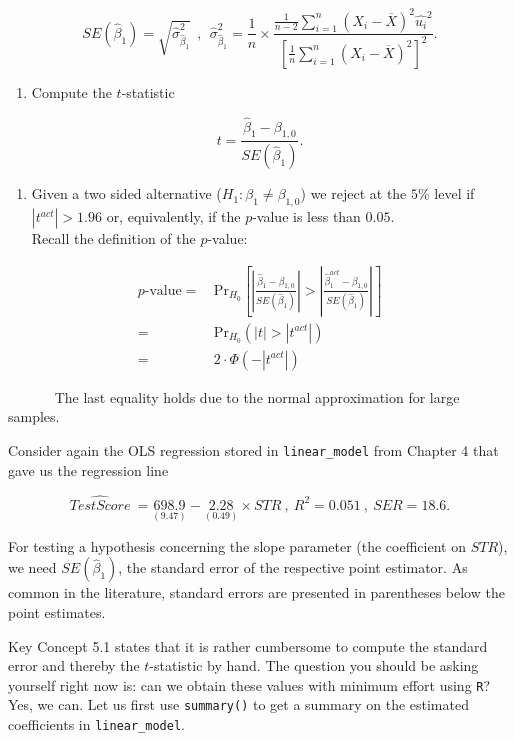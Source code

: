 \documentclass[]{book}
\providecommand{\tightlist}{%
  \setlength{\itemsep}{0pt}\setlength{\parskip}{0pt}}
\theoremstyle{definition}
\theoremstyle{definition}
\theoremstyle{definition}
\theoremstyle{remark}
\begin{document}
\[ SE(\hat{\beta}_1) = \sqrt{ \hat{\sigma}^2_{\hat{\beta}_1} } \ \ , \ \ 
  \hat{\sigma}^2_{\hat{\beta}_1} = \frac{1}{n} \times \frac{\frac{1}{n-2} \sum_{i=1}^n (X_i - \overline{X})^2 \hat{u_i}^2 }{ \left[ \frac{1}{n} \sum_{i=1}^n (X_i - \overline{X})^2 \right]^2}.
\]

\begin{enumerate}
\def\labelenumi{\arabic{enumi}.}
\setcounter{enumi}{1}
\tightlist
\item
  Compute the \(t\)-statistic
\end{enumerate}

\[ t = \frac{\hat{\beta}_1 - \beta_{1,0}}{ SE(\hat{\beta}_1) }. \]

\begin{enumerate}
\def\labelenumi{\arabic{enumi}.}
\setcounter{enumi}{2}
\tightlist
\item
  Given a two sided alternative (\(H_1:\beta_1 \neq \beta_{1,0}\)) we
  reject at the \(5\%\) level if \(|t^{act}| > 1.96\) or, equivalently,
  if the \(p\)-value is less than \(0.05\).\\
  Recall the definition of the \(p\)-value:
\end{enumerate}

\begin{align}
    p \text{-value} =& \, \text{Pr}_{H_0} \left[ \left| \frac{ \hat{\beta}_1 - \beta_{1,0} }{ SE(\hat{\beta}_1) } \right| > \left|        \frac{ \hat{\beta}_1^{act} - \beta_{1,0} }{ SE(\hat{\beta}_1) } \right| \right] \\
    =& \, \text{Pr}_{H_0} (|t| > |t^{act}|) \\
    =& \, 2 \cdot \Phi(-|t^{act}|)
  \end{align}

~~~~~~ The last equality holds due to the normal approximation for large
samples.

Consider again the OLS regression stored in \texttt{linear\_model} from
Chapter 4 that gave us the regression line

\[ \widehat{TestScore} \ = \underset{(9.47)}{698.9} - \underset{(0.49)}{2.28} \times STR \ , \ R^2=0.051 \ , \ SER=18.6. \]

For testing a hypothesis concerning the slope parameter (the coefficient
on \(STR\)), we need \(SE(\hat{\beta}_1)\), the standard error of the
respective point estimator. As common in the literature, standard errors
are presented in parentheses below the point estimates.

Key Concept 5.1 states that it is rather cumbersome to compute the
standard error and thereby the \(t\)-statistic by hand. The question you
should be asking yourself right now is: can we obtain these values with
minimum effort using \texttt{R}? Yes, we can. Let us first use
\texttt{summary()} to get a summary on the estimated coefficients in
\texttt{linear\_model}.
\end{document}
